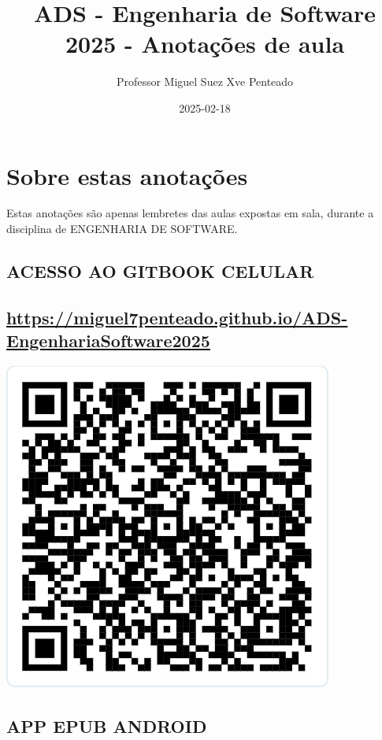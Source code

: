 \documentclass[
]{book}
\title{ADS - Engenharia de Software 2025 - Anotações de aula}
\author{Professor Miguel Suez Xve Penteado}
\date{2025-02-18}
\begin{document}
\maketitle

{
\setcounter{tocdepth}{1}
\tableofcontents
}
\chapter*{Sobre estas anotações}\label{sobre-estas-anotauxe7uxf5es}

Estas anotações são apenas lembretes das aulas expostas em sala, durante a disciplina de ENGENHARIA DE SOFTWARE.

\section{ACESSO AO GITBOOK CELULAR}\label{acesso-ao-gitbook-celular}

\section{\texorpdfstring{\url{https://miguel7penteado.github.io/ADS-EngenhariaSoftware2025}}{https://miguel7penteado.github.io/ADS-EngenhariaSoftware2025}}\label{httpsmiguel7penteado.github.ioads-engenhariasoftware2025}

\includegraphics{images/clipboard-3692082511.png}

\section{APP EPUB ANDROID}\label{app-epub-android}
\end{document}
